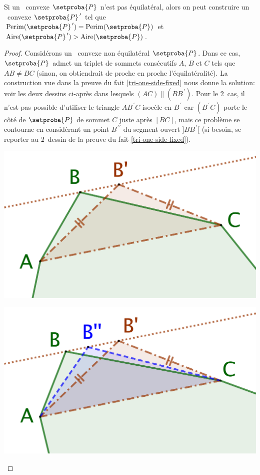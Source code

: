 

\begin{fact} \label{must-be-equi}
	Si un \ngone\ convexe $\setproba{P}$ n'est pas équilatéral,
	alors on peut construire un \ngone\ convexe $\primeit{\setproba{P}}$ tel que
	$\perim{\primeit{\setproba{P}}} = \perim{\setproba{P}}$
	et
	$\area{\primeit{\setproba{P}}} > \area{\setproba{P}}$.
\end{fact}


\begin{proof}
	Considérons un \ngone\ convexe non équilatéral $\setproba{P}$.
	Dans ce cas, $\setproba{P}$ admet un triplet de sommets consécutifs $A$, $B$ et $C$ tels que $AB \neq BC$
	(sinon, on obtiendrait de proche en proche l'équilatéralité).
	La construction vue dans la preuve du fait \ref{tri-one-side-fixed} nous donne la solution: voir les deux dessins ci-après dans lesquels $(AC) \parallel (BB^{\,\prime})$.
	Pour le 2\ieme\ cas, il n'est pas possible d'utiliser le triangle $AB^{\,\prime}C$ isocèle en $B^{\,\prime}$ car $(B^{\,\prime}C)$ porte le côté de $\setproba{P}$ de sommet $C$ juste après $[BC]$, mais ce problème se contourne en considérant un point $B^{\,\prime\prime}$ du segment ouvert $]BB^{\,\prime}[$ (si besoin, se reporter au 2\ieme\ dessin de la preuve du fait \ref{tri-one-side-fixed}).
	\begin{multicols}{2}
		\centering

		\includegraphics[scale=.4]{content/polygon/sol-must-be/not-iso-OK.png}

		\includegraphics[scale=.4]{content/polygon/sol-must-be/not-iso-KO.png}
	\end{multicols}


\end{proof}
